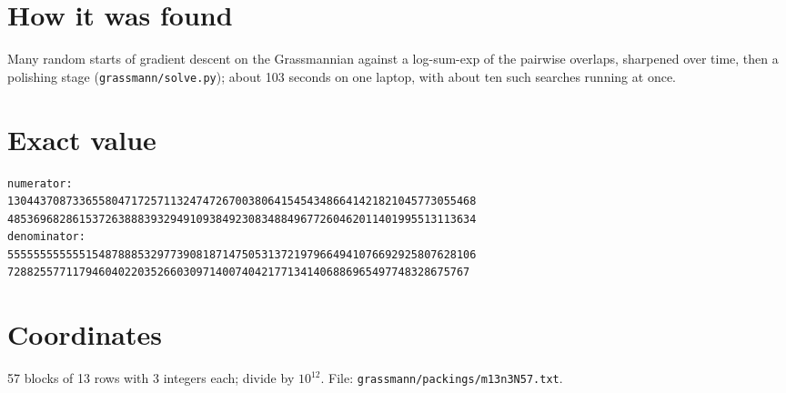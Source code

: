 \documentclass[11pt,a4paper]{article}
\begin{document}
\section{How it was found}
Many random starts of gradient descent on the Grassmannian against a log-sum-exp of the pairwise overlaps, sharpened over time, then a polishing stage (\texttt{grassmann/solve.py}); about 103 seconds on one laptop, with about ten such searches running at once.


\appendix
\section{Exact value}
{\small
\begin{verbatim}
numerator:
130443708733655804717257113247472670038064154543486641421821045773055468
485369682861537263888393294910938492308348849677260462011401995513113634
denominator:
555555555555154878885329773908187147505313721979664941076692925807628106
72882557711794604022035266030971400740421771341406886965497748328675767
\end{verbatim}}

\section{Coordinates}
57 blocks of 13 rows with 3 integers each; divide by $10^{12}$. File: \texttt{grassmann/packings/m13n3N57.txt}.
{\tiny
\begin{multicols}{3}
\end{multicols}}
\end{document}

